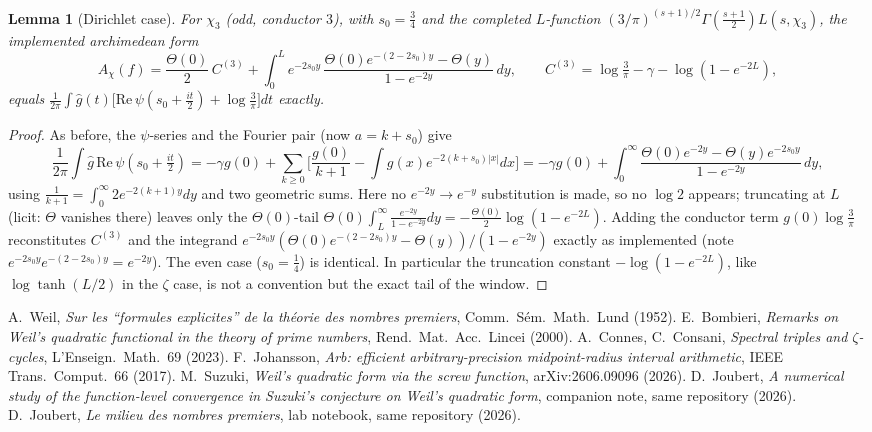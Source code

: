\documentclass[10pt]{article}
\newtheorem{lemma}{Lemma}
\begin{document}
\begin{lemma}[Dirichlet case]
For $\chi_3$ (odd, conductor $3$), with $s_0=\tfrac34$ and the completed
$L$-function $(3/\pi)^{(s+1)/2}\Gamma(\tfrac{s+1}2)L(s,\chi_3)$, the
implemented archimedean form
\[
A_{\chi}(f)=\frac{\Theta(0)}2\,C^{(3)}
+\int_0^L e^{-2s_0y}\,
\frac{\Theta(0)e^{-(2-2s_0)y}-\Theta(y)}{1-e^{-2y}}\,dy,
\qquad C^{(3)}=\log\tfrac3\pi-\gamma-\log(1-e^{-2L}),
\]
equals $\frac1{2\pi}\int\hat g(t)\big[\mathrm{Re}\,
\psi(s_0+\tfrac{it}2)+\log\tfrac3\pi\big]dt$ exactly.
\end{lemma}
\begin{proof}
As before, the $\psi$-series and the Fourier pair (now $a=k+s_0$) give
\[
\frac1{2\pi}\!\int\!\hat g\,\mathrm{Re}\,\psi(s_0+\tfrac{it}2)
=-\gamma g(0)+\sum_{k\ge0}\Big[\frac{g(0)}{k+1}
-\int g(x)e^{-2(k+s_0)|x|}dx\Big]
=-\gamma g(0)+\int_0^\infty
\frac{\Theta(0)e^{-2y}-\Theta(y)e^{-2s_0y}}{1-e^{-2y}}\,dy,
\]
using $\tfrac1{k+1}=\int_0^\infty2e^{-2(k+1)y}dy$ and two geometric
sums. Here no $e^{-2y}\!\to\!e^{-y}$ substitution is made, so no
$\log2$ appears; truncating at $L$ (licit: $\Theta$ vanishes there)
leaves only the $\Theta(0)$-tail
$\Theta(0)\int_L^\infty\frac{e^{-2y}}{1-e^{-2y}}dy
=-\tfrac{\Theta(0)}2\log(1-e^{-2L})$. Adding the conductor term
$g(0)\log\tfrac3\pi$ reconstitutes $C^{(3)}$ and the integrand
$e^{-2s_0y}(\Theta(0)e^{-(2-2s_0)y}-\Theta(y))/(1-e^{-2y})$
exactly as implemented (note $e^{-2s_0y}e^{-(2-2s_0)y}=e^{-2y}$). The
even case ($s_0=\tfrac14$) is identical. In particular the truncation
constant $-\log(1-e^{-2L})$, like $\log\tanh(L/2)$ in the $\zeta$
case, is not a convention but the exact tail of the window.
\end{proof}

\begin{thebibliography}{9}\small
{} A.~Weil, \emph{Sur les ``formules explicites'' de la th\'eorie
des nombres premiers}, Comm.\ S\'em.\ Math.\ Lund (1952).
 E.~Bombieri, \emph{Remarks on Weil's quadratic functional in
the theory of prime numbers}, Rend.\ Mat.\ Acc.\ Lincei (2000).
 A.~Connes, C.~Consani, \emph{Spectral triples and
$\zeta$-cycles}, L'Enseign.\ Math.\ 69 (2023).
 F.~Johansson, \emph{Arb: efficient arbitrary-precision
midpoint-radius interval arithmetic}, IEEE Trans.\ Comput.\ 66 (2017).
 M.~Suzuki, \emph{Weil's quadratic form via the screw
function}, arXiv:2606.09096 (2026).
 D.~Joubert, \emph{A numerical study of the
function-level convergence in Suzuki's conjecture on Weil's quadratic
form}, companion note, same repository (2026).
 D.~Joubert, \emph{Le milieu des nombres premiers}, lab
notebook, same repository (2026).
\end{thebibliography}
\end{document}
